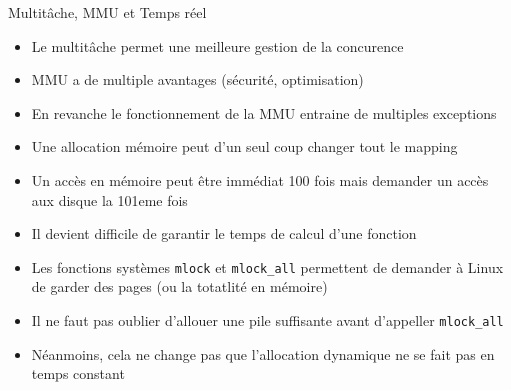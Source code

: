 









\begin{frame}{Multitâche, MMU et Temps réel} 
  \begin{itemize}
  \item Le multitâche permet une meilleure gestion de la concurence
  \item MMU a de multiple avantages (sécurité, optimisation)
  \item En revanche le fonctionnement  de la MMU entraine de multiples
    exceptions
  \item Une  allocation mémoire  peut d'un seul  coup changer  tout le
    mapping
  \item Un accès en mémoire  peut être immédiat 100 fois mais demander
    un accès aux disque la 101eme fois
  \item  Il devient  difficile de  garantir le  temps de  calcul d'une
    fonction
  \item Les  fonctions systèmes \texttt{mlock}  et \texttt{mlock\_all}
    permettent  de  demander  à  Linux  de garder  des  pages  (ou  la
    totatlité en mémoire)
  \item  Il ne  faut pas  oublier d'allouer  une pile  suffisante avant
    d'appeller \texttt{mlock\_all}
  \item Néanmoins, cela ne change pas que l'allocation dynamique ne se
    fait pas en temps constant
  \end{itemize} 
\end{frame} 

